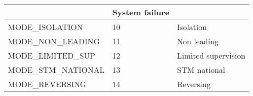 \documentclass{template/openetcs_article}
\begin{document}
\begin{longtable}{|l|l|l|}
	&	\begin{minipage}[t]{0.45\linewidth} System failure	\end{minipage} \\
	\hline
		\begin{minipage}[t]{0.45\linewidth} MODE\_ISOLATION	\end{minipage}
	&	\begin{minipage}[t]{0.15\linewidth} 10	\end{minipage} 
	&	\begin{minipage}[t]{0.45\linewidth} Isolation	\end{minipage} \\
	\hline
		\begin{minipage}[t]{0.45\linewidth} MODE\_NON\_LEADING	\end{minipage}
	&	\begin{minipage}[t]{0.15\linewidth} 11	\end{minipage} 
	&	\begin{minipage}[t]{0.45\linewidth} Non leading	\end{minipage} \\
	\hline
		\begin{minipage}[t]{0.45\linewidth} MODE\_LIMITED\_SUP	\end{minipage}
	&	\begin{minipage}[t]{0.15\linewidth} 12	\end{minipage} 
	&	\begin{minipage}[t]{0.45\linewidth} Limited supervision	\end{minipage} \\
	\hline
		\begin{minipage}[t]{0.45\linewidth} MODE\_STM\_NATIONAL	\end{minipage}
	&	\begin{minipage}[t]{0.15\linewidth} 13	\end{minipage} 
	&	\begin{minipage}[t]{0.45\linewidth} STM national	\end{minipage} \\
	\hline
		\begin{minipage}[t]{0.45\linewidth} MODE\_REVERSING	\end{minipage}
	&	\begin{minipage}[t]{0.15\linewidth} 14	\end{minipage} 
	&	\begin{minipage}[t]{0.45\linewidth} Reversing	\end{minipage} \\

\end{longtable}
\end{document}
